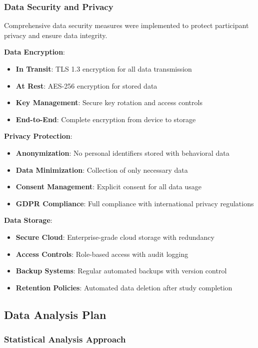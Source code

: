 \documentclass[12pt]{article}
\begin{document}
\subsubsection{Data Security and Privacy}

Comprehensive data security measures were implemented to protect participant privacy and ensure data integrity.

\textbf{Data Encryption}:
\begin{itemize}
    \item \textbf{In Transit}: TLS 1.3 encryption for all data transmission
    \item \textbf{At Rest}: AES-256 encryption for stored data
    \item \textbf{Key Management}: Secure key rotation and access controls
    \item \textbf{End-to-End}: Complete encryption from device to storage
\end{itemize}

\textbf{Privacy Protection}:
\begin{itemize}
    \item \textbf{Anonymization}: No personal identifiers stored with behavioral data
    \item \textbf{Data Minimization}: Collection of only necessary data
    \item \textbf{Consent Management}: Explicit consent for all data usage
    \item \textbf{GDPR Compliance}: Full compliance with international privacy regulations
\end{itemize}

\textbf{Data Storage}:
\begin{itemize}
    \item \textbf{Secure Cloud}: Enterprise-grade cloud storage with redundancy
    \item \textbf{Access Controls}: Role-based access with audit logging
    \item \textbf{Backup Systems}: Regular automated backups with version control
    \item \textbf{Retention Policies}: Automated data deletion after study completion
\end{itemize}

\subsection{Data Analysis Plan}

\subsubsection{Statistical Analysis Approach}
\end{document}

